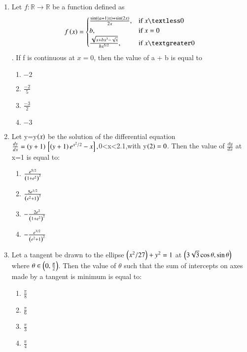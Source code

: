 \documentclass[journal,12pt,twocolumn]{IEEEtran}
\theoremstyle{remark}
\begin{document}
\begin{enumerate}[start=16]
\begin{enumerate}
\end{enumerate}
\item Let $f : \mathbb{R} \to \mathbb{R}$ be a function defined as 
\begin{equation}
	f\brak{x} = 
\begin{cases} 
\frac{\sin\brak{\brak{a+1}x} + \sin\brak{2x}}{2x}, & $if $  x \textless 0 \\ 
b, & $if $ x = 0 \\ 
\frac{\sqrt{x + bx^{3} - \sqrt{x}}}{bx^{5/2}}, & $if $ x \textgreater 0 
\end{cases}
\end{equation}
. If f is continuous at $ x = 0$, then the value of a + b is equal to
\begin{enumerate}
    \item $-2$
    \item $\frac{-2}{5}$
    \item $\frac{-3}{2}$
    \item $-3$
\end{enumerate}
\item Let y=y$\left(x\right)$ be the solution of the differential equation $\frac{dy}{dx}=\left(y+1\right){}\left[\left(y+1\right)e^{x^2/2}-x\right] ,$0\textless x\textless 2.1,with y$\left(2\right)=0$. Then the value of $\frac{dy}{dx}$ at x=1 is equal to:
\begin{enumerate}
\item $\frac{e^{5/2}}{\left(1 + e^{2}\right)^{2}} $
\item $ \frac{5 e^{1/2}}{\left(e^{2} + 1\right)^{2}} $
\item $ -\frac{2 e^{2}}{\left(1 + e^{2}\right)^{2}} $
\item $ -\frac{e^{3/2}}{\left(e^{2} + 1\right)^{2}} $
\end{enumerate}
\item Let a tangent be drawn to the ellipse $\left(x^2/27\right)+y^2=1$ at $\left(3\sqrt{3} \cos \theta, \sin \theta\right) \quad $where $ \theta \in \left(0, \frac{\pi}{2}\right)$.  Then the value of $\theta$ such that the sum of intercepts on axes made by a tangent is minimum is equal to:
\begin{enumerate}
    \item $\frac{\pi}{8}$
    \item $\frac{\pi}{6}$
    \item $\frac{\pi}{3}$
    \item $\frac{\pi}{4}$
\end{enumerate}

\end{enumerate}
\end{document}
